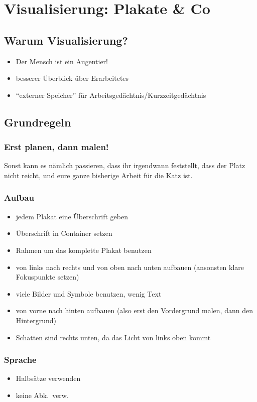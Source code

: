 \section{Visualisierung: Plakate \& Co}

\subsection{Warum Visualisierung?}
\begin{itemize}
  \item Der Mensch ist ein Augentier!
  \item besserer Überblick über Erarbeitetes
  \item "`externer Speicher"' für Arbeitsgedächtnis/Kurzzeitgedächtnis
\end{itemize}

\subsection{Grundregeln}

\subsubsection{Erst planen, dann malen!}
Sonst kann es nämlich passieren, dass ihr irgendwann feststellt, dass der Platz nicht reicht, und eure ganze bisherige Arbeit für die Katz ist.

\subsubsection{Aufbau}
\begin{itemize}
  \item jedem Plakat eine Überschrift geben
  \item Überschrift in Container setzen
  \item Rahmen um das komplette Plakat benutzen
  \item von links nach rechts und von oben nach unten aufbauen (ansonsten klare Fokuspunkte setzen)
  \item viele Bilder und Symbole\cite{bikablo} benutzen, wenig Text
  \item von vorne nach hinten aufbauen (also erst den Vordergrund malen, dann den Hintergrund)
  \item Schatten sind rechts unten, da das Licht von links oben kommt
\end{itemize}

\subsubsection{Sprache}
\begin{itemize}
  \item Halbsätze verwenden
  \item keine Abk.~verw.
\end{itemize}

